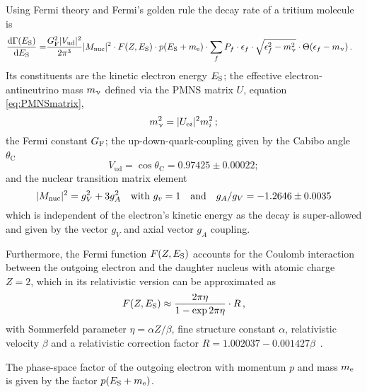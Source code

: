 Using Fermi theory and Fermi's golden rule the decay rate of a tritium molecule is~\cite{Kleesiek2019} 
\begin{align}
\label{eq:intSpecModelDiffSpec}
\frac{\mathop{}\!\mathrm{d}\Gamma(E_\mathrm{S})}{\mathop{}\!\mathrm{d} E_\mathrm{S}} = &
\frac{G_\mathrm{F}^2 \lvert V_\mathrm{ud}\rvert^2}{2 \pi^3}
\lvert M_\mathrm{nuc}\rvert^2 \cdot
F(Z, E_\mathrm{S}) \cdot 
p(E_\mathrm{S}+m_{\mathrm{e}}) \cdot 
\sum_{f} 
	P_f \cdot 
	\epsilon_f \cdot 
	\sqrt{\epsilon_f^2-m_\upnu^2} \cdot 
	\Theta(\epsilon_f-m_\upnu)
	\text{\,.}
\end{align}
Its constituents are the kinetic electron energy $E_\mathrm{S}$;
the effective electron-antineutrino mass $m_\upnu$ defined via the PMNS matrix $U$, equation \eqref{eq:PMNSmatrix},
\begin{equation}
	 m_\upnu^2 = \lvert U_{\mathrm{e} i}\rvert^2 m_i^2\,;
\end{equation}
the Fermi constant $G_\mathrm{F}$;
the up-down-quark-coupling given by the Cabibo angle $\theta_\mathrm{C}$~\cite{Kleesiek2019}
\begin{equation}
V_\mathrm{ud} = \cos \theta_\mathrm{C} = 
0.97425\pm0.00022;
\end{equation}
and the nuclear transition matrix element~\cite{Kleesiek2019}
\begin{equation}
\lvert M_\mathrm{nuc}\rvert^2 = g_V^2+3g_A^2 \quad
\text{with } g_v = 1 \quad
\text{and} \quad g_A/g_V = -1.2646 \pm 0.0035
\end{equation}
which is independent of the electron's kinetic energy as the decay is super-allowed and given by the vector $g_V$ and axial vector $g_A$ coupling.

Furthermore, the Fermi function $F(Z,E_\mathrm{S})$ accounts for the Coulomb interaction between the outgoing electron and the daughter nucleus with atomic charge $Z=2$, which in its relativistic version can be approximated as~\cite{Kleesiek2019}
\begin{equation}
F(Z,E_\mathrm{S}) \approx \frac{2 \pi \eta}{1-\exp{2 \pi \eta}} \cdot R
\text{\,,}
\end{equation}
with Sommerfeld parameter $\eta = \alpha Z / \beta$, fine structure constant $\alpha$, relativistic velocity $\beta$ and a relativistic correction factor $R = 1.002037-0.001427\beta$~\cite{Kleesiek2019}.

The phase-space factor of the outgoing electron with momentum $p$ and mass $m_{\mathrm{e}}$ is given by the factor $p(E_\mathrm{S}+m_{\mathrm{e}})$.

